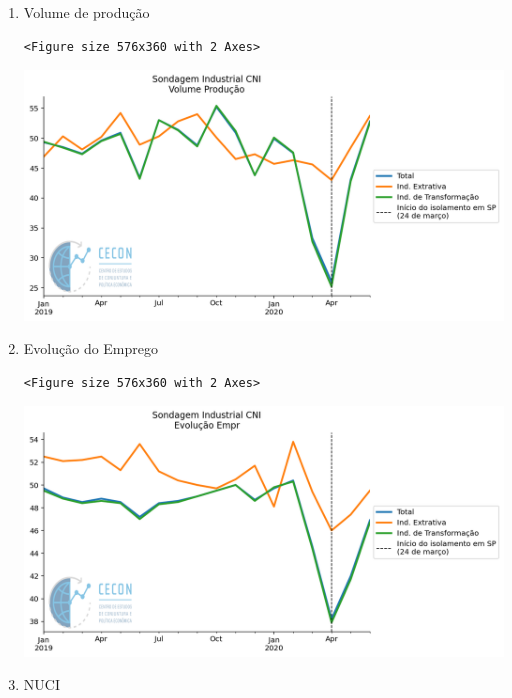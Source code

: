 \documentclass[11pt]{article}
\begin{document}
\begin{enumerate}
\item Volume de produção
\label{sec:org6af0afa}

\begin{verbatim}
<Figure size 576x360 with 2 Axes>
\end{verbatim}


\begin{center}
\includegraphics[width=.9\linewidth]{obipy-resources/62e383af79e91b63c7fc98dd7fb55b3c3ececcb9/38f547e28e64d3a45c6d27a727a62aa301d80753.png}
\end{center}

\item Evolução do Emprego
\label{sec:orgaa8647c}

\begin{verbatim}
<Figure size 576x360 with 2 Axes>
\end{verbatim}


\begin{center}
\includegraphics[width=.9\linewidth]{obipy-resources/62e383af79e91b63c7fc98dd7fb55b3c3ececcb9/f37059e5663a6183f7323a2bea6f3b8ed9dba88f.png}
\end{center}


\item NUCI
\label{sec:orgf65db06}


\end{enumerate}
\end{document}
